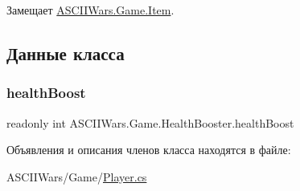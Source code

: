 Замещает \hyperlink{class_a_s_c_i_i_wars_1_1_game_1_1_item_a52412546f837bfc65a3aa9d728fa142f}{A\+S\+C\+I\+I\+Wars.\+Game.\+Item}.



\subsection{Данные класса}
\hypertarget{class_a_s_c_i_i_wars_1_1_game_1_1_health_booster_abd6f83cc8e561198c5939ba4a20fd826}{}\label{class_a_s_c_i_i_wars_1_1_game_1_1_health_booster_abd6f83cc8e561198c5939ba4a20fd826} 
\subsubsection{\texorpdfstring{health\+Boost}{healthBoost}}
{\footnotesize\ttfamily readonly int A\+S\+C\+I\+I\+Wars.\+Game.\+Health\+Booster.\+health\+Boost}



Объявления и описания членов класса находятся в файле\+:\begin{DoxyCompactItemize}
\item 
A\+S\+C\+I\+I\+Wars/\+Game/\hyperlink{_player_8cs}{Player.\+cs}\end{DoxyCompactItemize}
